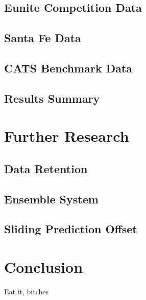 \documentclass[10pt]{article}
\begin{document}
\subsection{Eunite Competition Data}


\subsection{Santa Fe Data}


\subsection{CATS Benchmark Data}


\subsection{Results Summary}


\section{Further Research}

\subsection{Data Retention}


\subsection{Ensemble System}



\subsection{ Sliding Prediction Offset }


\section{Conclusion}
Eat it, bitches


\nocite{Moreno03}



\end{document}
